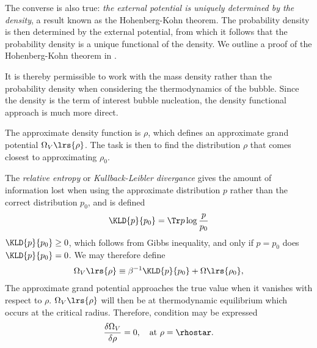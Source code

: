 { The converse is also true:
 {\em the external potential is uniquely determined by the density},
 a result known as the Hohenberg-Kohn theorem.
 The probability density is then determined by the external potential,
 from which it follows that the probability density is a unique functional of the density.
 We outline a proof of the Hohenberg-Kohn theorem in .
 

It is thereby permissible to work with the mass density rather than the probability density when considering the thermodynamics of the bubble.
Since the density is the term of interest bubble nucleation, the density functional approach is much more direct.



%
The approximate density function is $\rho$, which defines an approximate grand potential $\Omega_V\lrs{\rho}$.
The task is then to find the distribution $\rho$ that comes closest to approximating $\rho_0$.

The {\em relative entropy } or {\em Kullback-Leibler divergance} gives the amount of information lost 
when using the approximate distribution  $p$ rather than the correct distribution $p_0$,
and is defined
\begin{align}
  \KLD{p}{p_0} = \Tr p \log \frac{p}{p_0} \label{eqn:nuc:KLD}
\end{align}
$\KLD{p}{p_0} \ge 0$, which follows from Gibbs inequality, and only if $p=p_0$ does $\KLD{p}{p_0} = 0$.
We may therefore define
\begin{align}
 \Omega_V\lrs{\rho} \equiv \beta^{-1}\KLD{p}{p_0}+   \Omega\lrs{\rho_0}, 
\end{align}
The approximate  grand potential approaches the true value when 
it vanishes  with respect to $\rho$.
 $\Omega_V\lrs{\rho} $ will then be at thermodynamic equilibrium
which occurs at the critical radius.
Therefore,
condition \eqnref{}
may be expressed\cite{Oxtoby1992}
\begin{align}
  \frac{\delta \Omega_V}{\delta \rho} =0,\quad\text{at $\rho = \rhostar$.} \label{eqn:DFT:astar}
\end{align}

}
